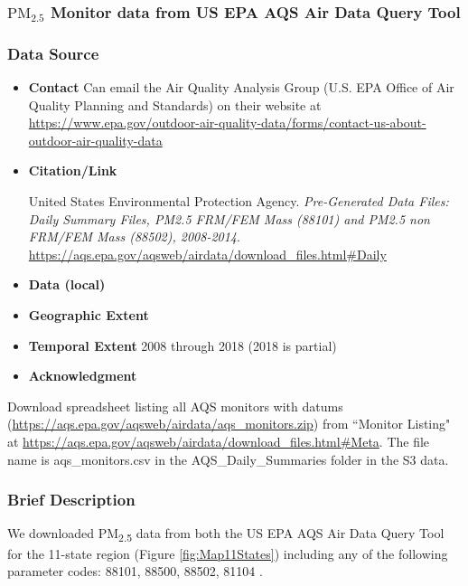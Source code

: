 \subsubsection{$\textrm{PM}_{2.5}$ Monitor data from US EPA AQS Air Data Query Tool}

\subsubsection*{Data Source}

\begin{itemize}[nolistsep]
\item \textbf{Contact} Can email the Air Quality Analysis Group (U.S. EPA Office of Air Quality Planning and Standards) on their website at \url{https://www.epa.gov/outdoor-air-quality-data/forms/contact-us-about-outdoor-air-quality-data}


\item \textbf{Citation/Link}

United States Environmental Protection Agency. \textit{Pre-Generated Data Files: Daily Summary Files, PM2.5 FRM/FEM Mass (88101) and PM2.5 non FRM/FEM Mass (88502), 2008-2014}. \url{https://aqs.epa.gov/aqsweb/airdata/download_files.html#Daily} 
\item \textbf{Data (local)}
\item \textbf{Geographic Extent}
\item \textbf{Temporal Extent}
2008 through 2018 (2018 is partial)
\item \textbf{Acknowledgment}
\end{itemize}

Download spreadsheet listing all AQS monitors with datums (\url{https://aqs.epa.gov/aqsweb/airdata/aqs_monitors.zip}) from ``Monitor Listing" at \url{https://aqs.epa.gov/aqsweb/airdata/download_files.html#Meta}. The file name is aqs\_monitors.csv in the AQS\_Daily\_Summaries folder in the S3 data.

\subsubsection*{Brief Description}

We downloaded PM\textsubscript{2.5} data from both the US EPA AQS Air Data Query Tool \citep{EPAAirData2017} %
for the 11-state region (Figure \ref{fig:Map11States}) including any of the following parameter codes: 88101, 88500, 88502, 81104 \citep{EPANPM25Memo2017,EPANPM25Parameters2017,EPANAllParameters2017}. %


